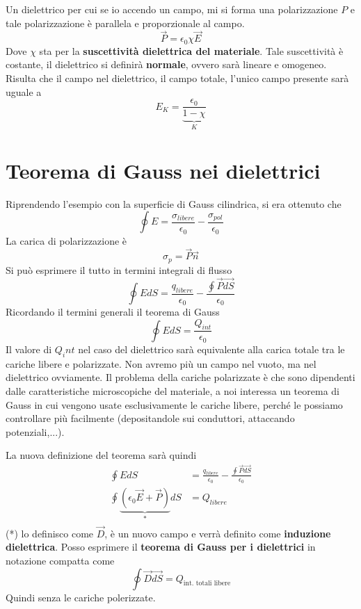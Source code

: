 \documentclass[a4paper, 12pt]{book}
\theoremstyle{plain}
\begin{document}
Un dielettrico per cui se io accendo un campo, mi si forma una polarizzazione $P$ e tale polarizzazione è parallela e 
proporzionale al campo.
\[
    \vec{P} = \epsilon_0 \chi \vec{E}
\]
Dove $\chi$ sta per la \textbf{suscettività dielettrica del materiale}. Tale suscettività è costante, il dielettrico si 
definirà \textbf{normale}, ovvero sarà lineare e omogeneo. Risulta che il campo nel dielettrico, il campo totale, l'unico campo presente 
sarà uguale a
\[
    E_K = \frac{\epsilon_0}{\underbrace{1 - \chi}_{K}}
\]

\section{Teorema di Gauss nei dielettrici}

Riprendendo l'esempio con la superficie di Gauss cilindrica, si era ottenuto che 
\[
    \oint E = \frac{\sigma_{libere}}{\epsilon_0} - \frac{\sigma_{pol}}{\epsilon_0}
\]
La carica di polarizzazione è 
\[
    \sigma_p = \vec{P} \vec{n}
\]
Si può esprimere il tutto in termini integrali di flusso 
\[
    \oint E dS = \frac{q_{libere}}{\epsilon_0} - \frac{\oint \vec{P} \vec{dS}}{\epsilon_0}
\]
Ricordando il termini generali il teorema di Gauss
\[
    \oint E dS = \frac{Q_{int}}{\epsilon_0}
\]
Il valore di $Q_int$ nel caso del dielettrico sarà equivalente alla carica totale tra le cariche libere e polarizzate. Non avremo più 
un campo nel vuoto, ma nel dielettrico ovviamente. Il problema della cariche polarizzate è che sono dipendenti dalle caratteristiche 
microscopiche del materiale, a noi interessa un teorema di Gauss in cui vengono usate esclusivamente le cariche libere, perché le possiamo 
controllare più facilmente (depositandole sui conduttori, attaccando potenziali,...).

La nuova definizione del teorema sarà quindi 
\[
    \begin{split}
        \oint E dS &= \frac{q_{libere}}{\epsilon_0} - \frac{\oint \vec{P} \vec{dS}}{\epsilon_0} \\
        \oint \underbrace{(\epsilon_0 \vec{E} + \vec{P})}_{*} dS &= Q_{libere} \\
    \end{split}
\]
(*) lo definisco come $\vec{D}$, è un nuovo campo e verrà definito come \textbf{induzione dielettrica}. Posso esprimere il \textbf{teorema 
di Gauss per i dielettrici} in notazione compatta come 
\[
    \oint \vec{D} \vec{dS} = Q_{\textrm{int. totali libere}}
\]
Quindi senza le cariche polerizzate. 
\end{document}

